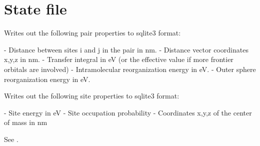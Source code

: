 \section{State file}
\label{sec:statefile}

Writes out the following pair properties to sqlite3 format:

 - Distance between sites i and j in the pair in nm.
 - Distance vector coordinates x,y,z in nm.
 - Transfer integral in eV (or the effective value if more frontier orbitals are involved)
 - Intramolecular reorganization energy in eV.
 - Outer sphere reorganization energy in eV.

Writes out the following site properties to sqlite3 format:

 - Site energy in eV
 - Site occupation probability
 - Coordinates x,y,z of the center of mass in nm

See .